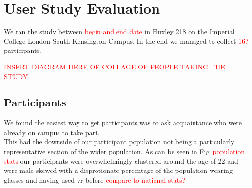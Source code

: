 \section{User Study Evaluation}
We ran the study between \textcolor{red}{begin and end date} in Huxley 218 on the Imperial College London South Kensington Campus. In the end we managed to collect \textcolor{red}{16?} participants.

\textcolor{red}{INSERT DIAGRAM HERE OF COLLAGE OF PEOPLE TAKING THE STUDY}

\subsection{Participants}
 We found the easiest way to get participants was to ask acquaintance who were already on campus to take part. \\

This had the downside of our participant population not being a particularly representative section of the wider population. As can be seen in Fig~\textcolor{red}{population stats} our participants were overwhelmingly clustered around the age of 22 and were male skewed with a disprotionate percentage of the population wearing glasses and having used vr before \textcolor{red}{compare to national stats?}

